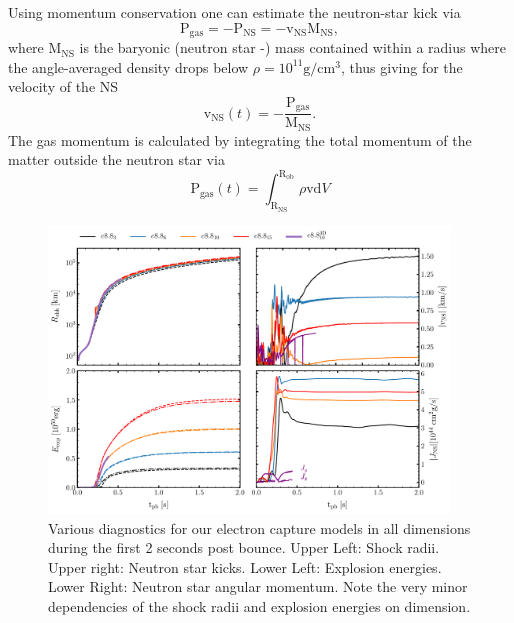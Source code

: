 \documentclass[fleqn,usenatbib]{mnras}
\newcommand{\ud}{\ensuremath{\mathrm{d}}}
\begin{document}
Using momentum conservation one can estimate the neutron-star kick via
\begin{equation}
  \pmb{\mathrm{P}}_{\mathrm{gas}} = - \pmb{\mathrm{P}}_{\mathrm{NS}} = - \pmb{\mathrm{v}}_{\mathrm{NS}}\mathrm{M_{NS}},
\end{equation}
where $\mathrm{M_{NS}}$ is the baryonic (neutron star -) mass contained within a radius where the angle-averaged density drops below $\rho = 10^{11} \mathrm{g/cm^3}$, thus giving for the velocity of the NS
\begin{equation}
  \pmb{\mathrm{v}}_{\mathrm{NS}}(t) = - \frac{\pmb{\mathrm{P}}_{\mathrm{gas}}}{ \mathrm{M_{NS}}}.
  \label{equ:momentum_kick}
\end{equation}
The gas momentum is calculated by integrating the total momentum of the matter outside the neutron star via
\begin{equation}
    \label{equ:pz}
  \pmb{\mathrm{P}}_{\mathrm{gas}} (t) = \int_{\mathrm{R_{NS}}}^{\mathrm{R_{ob}}} \rho \pmb{\mathrm{v}} \ud V
\end{equation}

\begin{figure}
 \centering
 \includegraphics[width=0.95\textwidth]{pic/eexp_kick_all_1d2d3d.pdf}
 \caption{Various diagnostics for our electron capture models in all dimensions during the first 2 seconds post bounce. Upper Left: Shock radii. Upper right: Neutron star kicks. Lower Left: Explosion energies. Lower Right: Neutron star angular momentum. Note the very minor dependencies of the shock radii and explosion energies on dimension. }
 \label{fig:e8pzkick}
\end{figure}
\end{document}
